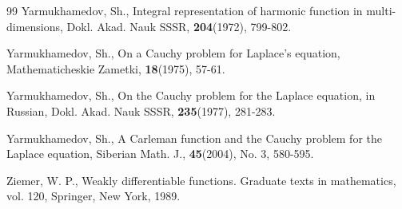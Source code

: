\begin{thebibliography}{99}
 Yarmukhamedov, Sh.,
             Integral representation of harmonic function in multi-dimensions,
             Dokl. Akad. Nauk SSSR, {\bf 204}(1972), 799-802.





 Yarmukhamedov, Sh.,
             On a Cauchy problem for Laplace's equation, 
             Mathematicheskie Zametki, {\bf 18}(1975), 57-61.




 Yarmukhamedov, Sh.,
             On the Cauchy problem for the Laplace equation, in Russian,
             Dokl. Akad. Nauk SSSR, {\bf 235}(1977), 281-283.
             


  
          

           


 Yarmukhamedov, Sh.,
             A Carleman function and the Cauchy problem for the Laplace equation, 
             Siberian Math. J., {\bf 45}(2004), No. 3, 580-595.





 Ziemer, W. P., 
             Weakly differentiable functions.  Graduate texts in mathematics, vol. 120, Springer, New York, 1989.



\end{thebibliography}



















































